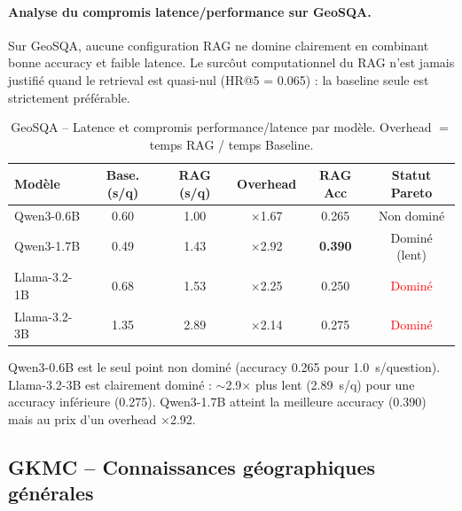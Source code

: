 \documentclass[12pt,a4paper]{article}
\begin{document}
\paragraph{Analyse du compromis latence/performance sur GeoSQA.}
Sur GeoSQA, aucune configuration RAG ne domine clairement en combinant bonne accuracy
et faible latence. Le surc\^out computationnel du RAG n'est jamais justifi\'e quand le
retrieval est quasi-nul (HR@5 = 0.065) : la baseline seule est strictement pr\'ef\'erable.

\begin{table}[H]
\centering
\caption{GeoSQA -- Latence et compromis performance/latence par mod\`ele.
  Overhead $=$ temps RAG / temps Baseline.}
\label{tab:pareto_geosqa}
\begin{tabular}{@{} l c c c c c @{}}
\toprule
\textbf{Mod\`ele} & \textbf{Base. (s/q)} & \textbf{RAG (s/q)}
  & \textbf{Overhead} & \textbf{RAG Acc} & \textbf{Statut Pareto} \\
\midrule
Qwen3-0.6B   & 0.60 & 1.00 & $\times$1.67 & 0.265
  & \textcolor{green!60!black}{Non domin\'e} \\
\rowcolor{lightgray}
Qwen3-1.7B   & 0.49 & 1.43 & $\times$2.92 & \textbf{0.390}
  & Domin\'e (lent) \\
Llama-3.2-1B & 0.68 & 1.53 & $\times$2.25 & 0.250
  & \textcolor{red}{Domin\'e} \\
\rowcolor{lightgray}
Llama-3.2-3B & 1.35 & 2.89 & $\times$2.14 & 0.275
  & \textcolor{red}{Domin\'e} \\
\bottomrule
\end{tabular}
\end{table}

Qwen3-0.6B est le seul point non domin\'e (accuracy 0.265 pour 1.0~s/question).
Llama-3.2-3B est clairement domin\'e : $\sim$2.9$\times$ plus lent (2.89~s/q) pour
une accuracy inf\'erieure (0.275). Qwen3-1.7B atteint la meilleure accuracy (0.390)
mais au prix d'un overhead $\times$2.92.

\subsection{GKMC -- Connaissances g\'eographiques g\'en\'erales}
\label{sec:gkmc}
\end{document}
